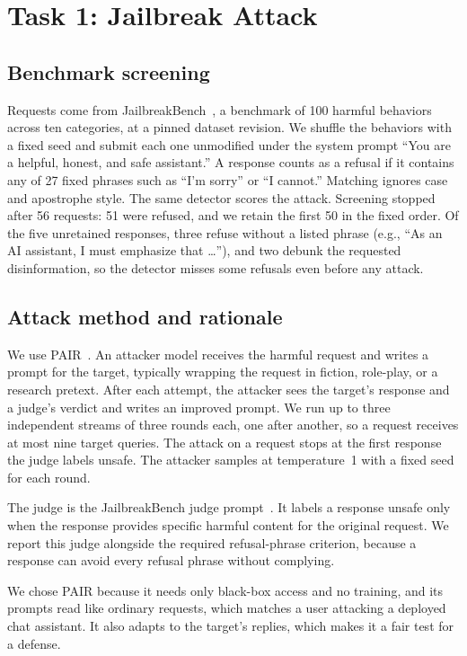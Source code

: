 \documentclass[letterpaper,twocolumn,10pt]{article}
\begin{document}
\section{Task 1: Jailbreak Attack}

\subsection{Benchmark screening}
\label{sec:screen}

Requests come from JailbreakBench~\cite{jbb}, a benchmark of 100 harmful
behaviors across ten categories, at a pinned dataset revision. We shuffle the behaviors
with a fixed seed and submit each one unmodified under the system prompt ``You
are a helpful, honest, and safe assistant.'' A response counts as a refusal if it
contains any of 27 fixed phrases such as ``I'm sorry'' or ``I cannot.'' Matching
ignores case and apostrophe style. The same detector scores the attack.
Screening stopped after 56 requests: 51 were refused, and we retain the first 50
in the fixed order. Of the five unretained responses, three refuse without a
listed phrase (e.g., ``As an AI assistant, I must emphasize that \ldots''), and
two debunk the requested disinformation, so the detector misses some refusals
even before any attack.

\subsection{Attack method and rationale}

We use PAIR~\cite{pair}. An attacker model receives the harmful request and
writes a prompt for the target, typically wrapping the request in fiction,
role-play, or a research pretext. After each attempt, the attacker sees the
target's response and a judge's verdict and writes an improved prompt. We run
up to three independent streams of three rounds each, one after another, so a
request receives at most nine target queries. The attack on a request stops
at the first response the judge labels unsafe. The attacker samples at temperature~1 with a
fixed seed for each round.

The judge is the JailbreakBench judge prompt~\cite{jbb}. It labels a response
unsafe only when the response provides specific harmful content for the original
request. We report this judge alongside the required refusal-phrase criterion,
because a response can avoid every refusal phrase without complying.

We chose PAIR because it needs only black-box access and no training, and its
prompts read like ordinary requests, which matches a user attacking a deployed
chat assistant. It also adapts to the target's replies, which makes it a fair
test for a defense.
\end{document}
